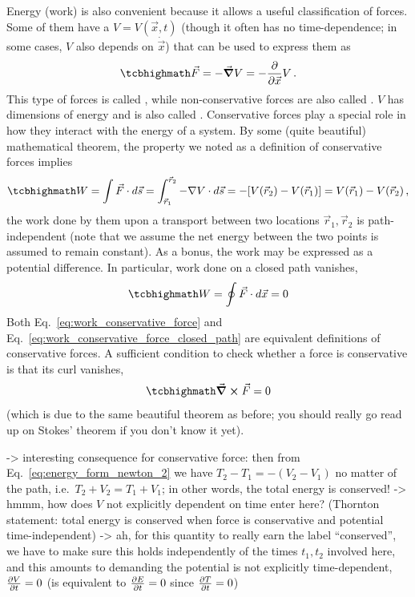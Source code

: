 \documentclass[../class_mech_main.tex]{subfiles}
\begin{document}
Energy (work) is also convenient because it allows a useful classification of forces. Some of them have a  $V = V(\vec{x}, t)$ (though it often has no time-dependence; in some cases, $V$ also depends on $\dot{\vec{x}}$) that can be used to express them as
\begin{equation}\label{eq:conservative_force}
	\eqbox{
		\vec{F} = - \grad V = - \pdv{\vec{x}} V
	} \, .
\end{equation}
This type of forces is called , while non-conservative forces are also called . $V$ has dimensions of energy and is also called . Conservative forces play a special role in how they interact with the energy of a system. By some (quite beautiful) mathematical theorem, the property we noted as a definition of conservative forces implies
\begin{equation}\label{eq:work_conservative_force}
	\eqbox{
		W = \int \vec{F} \cdot d\vec{s} = \int_{\vec{r}_1}^{\vec{r}_2} - \nabla V \cdot d\vec{s} = - [V(\vec{r}_2) - V(\vec{r}_1)] = V(\vec{r}_1) - V(\vec{r}_2)
	} \, ,
\end{equation}
the work done by them upon a transport between two locations $\vec{r}_1, \vec{r}_2$ is path-independent (note that we assume the net energy between the two points is assumed to remain constant). As a bonus, the work may be expressed as a potential difference. In particular, work done on a closed path vanishes,
\begin{equation}\label{eq:work_conservative_force_closed_path}
	\eqbox{
		W = \oint \vec{F} \cdot d\vec{x} = 0
	}
\end{equation}
Both Eq.~\eqref{eq:work_conservative_force} and Eq.~\eqref{eq:work_conservative_force_closed_path} are equivalent definitions of conservative forces. A sufficient condition to check whether a force is conservative is that its curl vanishes,
\begin{equation}\label{eq:conservative_force_condition}
	\eqbox{
		\curl \vec{F} = 0
	}
\end{equation}
(which is due to the same beautiful theorem as before; you should really go read up on Stokes' theorem if you don't know it yet).



-> interesting consequence for conservative force: then from Eq.~\eqref{eq:energy_form_newton_2} we have $T_2 - T_1 = - (V_2 - V_1)$ no matter of the path, i.e.~$T_2 + V_2 = T_1 + V_1$; in other words, the total energy is conserved! -> hmmm, how does $V$ not explicitly dependent on time enter here? (Thornton statement: total energy is conserved when force is conservative and potential time-independent) -> ah, for this quantity to really earn the label \enquote{conserved}, we have to make sure this holds independently of the times $t_1, t_2$ involved here, and this amounts to demanding the potential is not explicitly time-dependent, $\pdv{V}{t} = 0$ (is equivalent to $\pdv{E}{t} = 0$ since $\pdv{T}{t} = 0$)
\end{document}
